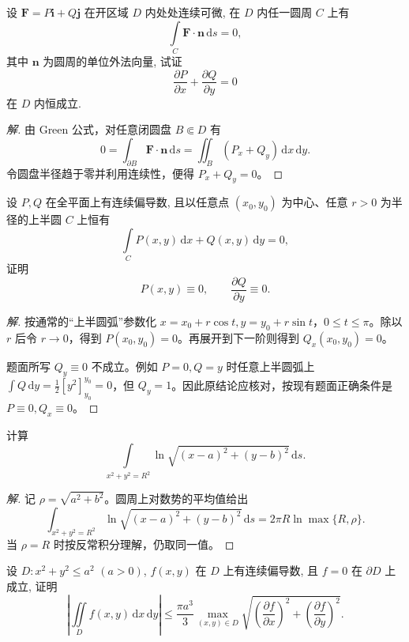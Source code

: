 \documentclass[../../数学分析培优讲义(答案版).tex]{subfiles}
\begin{document}
\begin{example}[\markstar]
设 $\bm F=P\bm i+Q\bm j$ 在开区域 $D$ 内处处连续可微, 在 $D$ 内任一圆周 $C$ 上有
\[
    \int\limits_C\bm F\cdot\bm n\,\mathrm{d}s=0,
\]
其中 $\bm n$ 为圆周的单位外法向量, 试证
\[
    \dfrac{\partial P}{\partial x}+\dfrac{\partial Q}{\partial y}=0
\]
在 $D$ 内恒成立.
\end{example}

\begin{proof}[解]
由 Green 公式，对任意闭圆盘 $B\Subset D$ 有
\[
0=\int_{\partial B}\bm F\cdot\bm n\,\mathrm{d}s
=\iint_B(P_x+Q_y)\,\mathrm{d}x\,\mathrm{d}y.
\]
令圆盘半径趋于零并利用连续性，便得 $P_x+Q_y=0$。
\end{proof}

\begin{example}[\markstar]
设 $P,Q$ 在全平面上有连续偏导数, 且以任意点 $(x_0,y_0)$ 为中心、任意 $r>0$ 为半径的上半圆 $C$ 上恒有
\[
    \int\limits_C P(x,y)\,\mathrm{d}x+Q(x,y)\,\mathrm{d}y=0,
\]
证明
\[
    P(x,y)\equiv0,
    \qquad
    \dfrac{\partial Q}{\partial y}\equiv0.
\]
\end{example}

\begin{proof}[解]
按通常的“上半圆弧”参数化 $x=x_0+r\cos t,y=y_0+r\sin t$，$0\leq t\leq\pi$。除以 $r$ 后令 $r\to0$，得到 $P(x_0,y_0)=0$。再展开到下一阶则得到 $Q_x(x_0,y_0)=0$。

题面所写 $Q_y\equiv0$ 不成立。例如 $P=0,Q=y$ 时任意上半圆弧上 $\int Q\,\mathrm{d}y=\frac{1}{2}[y^2]_{y_0}^{y_0}=0$，但 $Q_y=1$。因此原结论应核对，按现有题面正确条件是 $P\equiv0,Q_x\equiv0$。
\end{proof}

\begin{example}
计算
\[
    \int\limits_{x^2+y^2=R^2}\ln\sqrt{(x-a)^2+(y-b)^2}\,\mathrm{d}s.
\]
\end{example}

\begin{proof}[解]
记 $\rho=\sqrt{a^2+b^2}$。圆周上对数势的平均值给出
\[
\int_{x^2+y^2=R^2}\ln\sqrt{(x-a)^2+(y-b)^2}\,\mathrm{d}s
=2\pi R\ln\max\{R,\rho\}.
\]
当 $\rho=R$ 时按反常积分理解，仍取同一值。
\end{proof}

\begin{example}
设 $D:x^2+y^2\leq a^2$ $(a>0)$, $f(x,y)$ 在 $D$ 上有连续偏导数, 且 $f=0$ 在 $\partial D$ 上成立, 证明
\[
    \left|\iint\limits_Df(x,y)\,\mathrm{d}x\,\mathrm{d}y\right|
    \leq\dfrac{\pi a^3}{3}\max_{(x,y)\in D}
    \sqrt{\left(\dfrac{\partial f}{\partial x}\right)^2+
    \left(\dfrac{\partial f}{\partial y}\right)^2}.
\]
\end{example}
\end{document}
